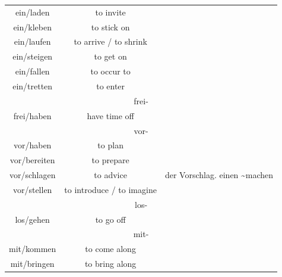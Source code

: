 \begin{center}
\begin{longtable} {|c|c|c|}
        ein/laden       & to invite                 &                                             \\
        ein/kleben      & to stick on               &                                             \\
        ein/laufen      & to arrive / to shrink     &                                             \\
        ein/steigen     & to get on                 &                                             \\
        ein/fallen      & to occur to               &                                             \\
        ein/tretten     & to enter                  &                                             \\
        \hline
        \multicolumn{3}{|c|}{frei-}                                                               \\
        \hline
        frei/haben      & have time off             &                                             \\
        \hline
        \multicolumn{3}{|c|}{vor-}                                                                \\
        \hline
        vor/haben       & to plan                   &                                             \\
        vor/bereiten    & to prepare                &                                             \\
        vor/schlagen    & to advice                 & der Vorschlag. einen \textasciitilde machen \\
        vor/stellen     & to introduce / to imagine &                                             \\
        \hline
        \multicolumn{3}{|c|}{los-}                                                                \\
        \hline
        los/gehen       & to go off                 &                                             \\
        \hline
        \multicolumn{3}{|c|}{mit-}                                                                \\
        \hline
        mit/kommen      & to come along             &                                             \\
        mit/bringen     & to bring along            &                                             \\

\end{longtable}
\end{center}
